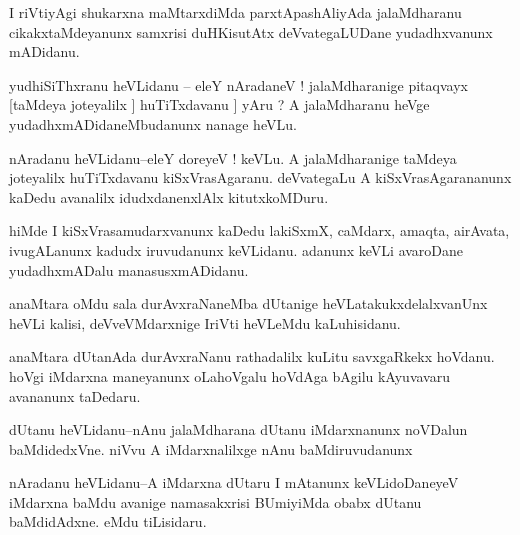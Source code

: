 \documentclass{article}
\begin{document}
\begin{mn}%
I riVtiyAgi shukarxna maMtarxdiMda parxtApashAliyAda jalaMdharanu cikakxtaMdeyanunx samxrisi 
duHKisutAtx deVvategaLUDane yudadhxvanunx mADidanu.
\end{mn}


\begin{mn}%
yudhiSiThxranu heVLidanu -- eleY nAradaneV ! jalaMdharanige pitaqvayx [taMdeya joteyalilx ]
huTiTxdavanu ] yAru ? A jalaMdharanu heVge yudadhxmADidaneMbudanunx nanage heVLu.
\end{mn}

\begin{mn}%
nAradanu heVLidanu--eleY doreyeV ! keVLu. A jalaMdharanige taMdeya joteyalilx huTiTxdavanu 
kiSxVrasAgaranu. deVvategaLu A kiSxVrasAgarananunx kaDedu avanalilx idudxdanenxlAlx 
kitutxkoMDuru.
\end{mn}

\begin{mn}%
hiMde I kiSxVrasamudarxvanunx kaDedu lakiSxmX, caMdarx, amaqta, airAvata, ivugALanunx kadudx 
iruvudanunx keVLidanu. adanunx keVLi avaroDane yudadhxmADalu manasusxmADidanu.
\end{mn}

\begin{mn}%
anaMtara oMdu sala durAvxraNaneMba dUtanige heVLatakukxdelalxvanUnx heVLi kalisi, 
deVveVMdarxnige IriVti heVLeMdu kaLuhisidanu.
\end{mn}

\begin{mn}%
anaMtara dUtanAda durAvxraNanu rathadalilx kuLitu savxgaRkekx hoVdanu. hoVgi iMdarxna 
maneyanunx oLahoVgalu hoVdAga bAgilu kAyuvavaru avananunx taDedaru.
\end{mn}

\begin{mn}%
dUtanu heVLidanu--nAnu jalaMdharana dUtanu iMdarxnanunx noVDalun baMdidedxVne. niVvu A 
iMdarxnalilxge nAnu baMdiruvudanunx
\end{mn}

\begin{mn}%
nAradanu heVLidanu--A iMdarxna dUtaru I mAtanunx keVLidoDaneyeV iMdarxna baMdu avanige 
namasakxrisi BUmiyiMda obabx dUtanu baMdidAdxne. eMdu tiLisidaru.
\end{mn}
\end{document}
